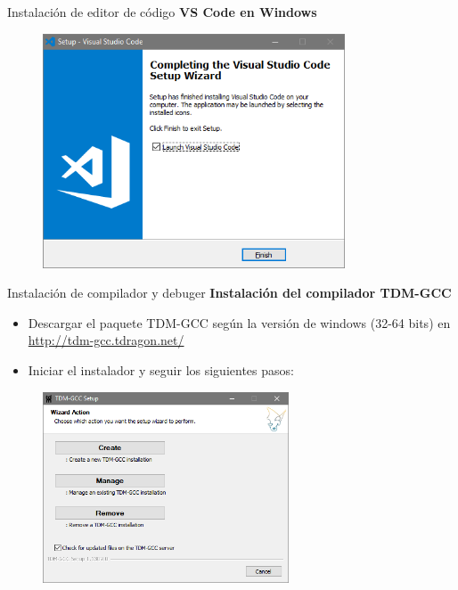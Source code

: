 \begin{frame}[fragile]{Instalación de editor de código}
  \textbf{VS Code en Windows}
   \begin{figure}
     \includegraphics[width=0.8\textwidth]{./resources/VSCODE_Step_08.PNG}
   \end{figure}
\end{frame}

\begin{frame}[fragile]{Instalación de compilador y debuger}
 \textbf{Instalación del compilador TDM-GCC}
 \begin{itemize}[<+(1)->]
  \item Descargar el paquete TDM-GCC según la versión de windows (32-64 bits) en \url{http://tdm-gcc.tdragon.net/}
  \item Iniciar el instalador y seguir los siguientes pasos:
 \end{itemize}
    \begin{figure}
                    \includegraphics[width=0.65\textwidth]{./resources/TDMGCC_Step_01.PNG}
                \end{figure}
\end{frame}

